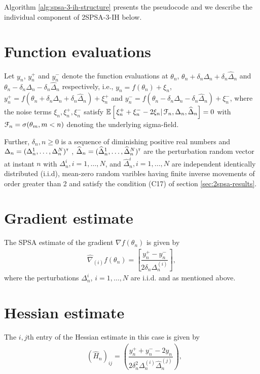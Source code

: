 Algorithm \ref{alg:spsa-3-ih-structure} presents the pseudocode and we describe the individual component of 2SPSA-3-IH below.
\section{Function evaluations}
Let $y_n$, $y_n^+$ and $y_n^-$ denote the function evaluations at $\theta_n$, $\theta_n+\delta_n \Delta_n+\delta_n \widehat \Delta_n$ and $\theta_n -\delta_n\Delta_n-\delta_n\widehat\Delta_n$ respectively, i.e., 
$y_n = f(\theta_n) + \xi_n$, $y_n^+ = f(\theta_n+\delta_n \Delta_n +\delta_n \widehat\Delta_n) + \xi_n^+$ and 
$y_n^- = f(\theta_n -\delta_n\Delta_n-\delta_n\widehat\Delta_n) + \xi_n^-$,
where the noise terms $\xi_n, \xi_n^+, \xi_n^-$ satisfy $\mathbb{E}\left[\left.\xi_n^+ + \xi_n^- - 2\xi_n \right| \mathcal{F}_n, \Delta_n, \widehat \Delta_n\right] = 0$ with $\mathcal{F}_n = \sigma(\theta_m,m <  n)$ denoting the underlying sigma-field.

Further, $\delta_n, n\geq 0$ is a sequence of diminishing positive real numbers and $\Delta_n = (\Delta_n^1,\ldots,\Delta_n^N)^\mathsf{\scriptscriptstyle T}$ , $\widehat\Delta_n = (\widehat\Delta_n^1,\ldots,\widehat\Delta_n^N)^\mathsf{\scriptscriptstyle T}$ are the perturbation random vector at instant $n$ with $\Delta_n^i,i=1,\ldots,N$, and $\widehat\Delta_n^i,i=1,\ldots,N$ are independent identically distributed (i.i.d), mean-zero random varibles having finite inverse movements of order greater than 2 and satisfy the condition (C17) of section \ref{sec:2spsa-results}.  

\section{Gradient estimate}
The SPSA estimate of the gradient $\nabla f(\theta_n)$ is given by
\begin{align}
\label{eq:grad-spsa}
\widehat\nabla_{(i)} f(\theta_n) =  \left[ \dfrac{y_n^+ - y_n^-}{2\delta_n \Delta_n^{(i)}}\right],
\end{align}
where the perturbations $\Delta_n^i$, $i=1,\ldots,N$ are i.i.d. and as mentioned above.


\section{Hessian estimate}
The $i,j$th entry of the Hessian estimate in this case is given by
\begin{align}
\label{eq:2spsa-ber}
&\left(\widehat H_n\right)_{ij} =  \left(\dfrac{y_n^+ + y_n^- - 2 y_n}{2\delta_n^2 \Delta_n^{(i)} \widehat \Delta_n^{(j)}}\right), 
\end{align}
